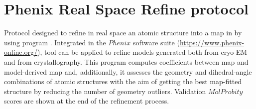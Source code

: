 \section{Phenix Real Space Refine protocol}
\label{app:realSpaceRefineProtocol}%
Protocol designed to refine in real space an atomic structure into a map in \scipion by using  program \citep{afonine2018}. Integrated in the $Phenix$ software suite (\url{https://www.phenix-online.org/}),  tool can be applied to refine models generated both from cryo-EM and from crystallography. This program computes  coefficients between map and model-derived map and, additionally, it assesses the geometry and dihedral-angle combinations of atomic structures with the aim of getting the best map-fitted structure by reducing the number of geometry outliers.   Validation $MolProbity$ scores are shown at the end of the refinement process.

